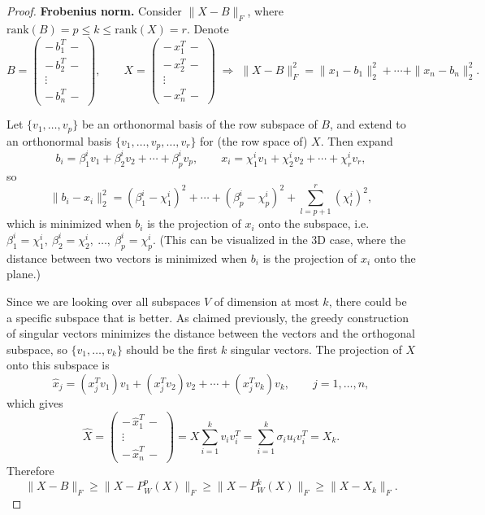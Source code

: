 \documentclass[
  letterpaper,
  DIV=11,
  numbers=noendperiod]{scrreprt}
\theoremstyle{definition}
\theoremstyle{plain}
\theoremstyle{plain}
\theoremstyle{definition}
\theoremstyle{plain}
\theoremstyle{plain}
\theoremstyle{remark}
\begin{document}
\begin{proof}
\textbf{Frobenius norm.} Consider \(\|X - B\|_F\), where
\(\mathrm{rank}(B) = p \le k \le \mathrm{rank}(X) = r\). Denote \[
B = \begin{pmatrix} -\,b_1^T\,- \\ -\,b_2^T\,- \\ \vdots \\ -\,b_n^T\,- \end{pmatrix}, \qquad
X = \begin{pmatrix} -\,x_1^T\,- \\ -\,x_2^T\,- \\ \vdots \\ -\,x_n^T\,- \end{pmatrix}
\;\Rightarrow\;
\|X - B\|_F^2 = \|x_1 - b_1\|_2^2 + \cdots + \|x_n - b_n\|_2^2 .
\]

Let \(\{v_1, \dots, v_p\}\) be an orthonormal basis of the row subspace
of \(B\), and extend to an orthonormal basis
\(\{v_1, \dots, v_p, \dots, v_r\}\) for (the row space of) \(X\). Then
expand \[
b_i = \beta_1^i v_1 + \beta_2^i v_2 + \cdots + \beta_p^i v_p, \qquad
x_i = \chi_1^i v_1 + \chi_2^i v_2 + \cdots + \chi_r^i v_r ,
\] so \[
\|b_i - x_i\|_2^2 = (\beta_1^i - \chi_1^i)^2 + \cdots + (\beta_p^i - \chi_p^i)^2 + \sum_{l=p+1}^{r} (\chi_l^i)^2 ,
\] which is minimized when \(b_i\) is the projection of \(x_i\) onto the
subspace,
i.e.~\(\beta_1^i = \chi_1^i,\ \beta_2^i = \chi_2^i,\ \dots,\ \beta_p^i = \chi_p^i\).
(This can be visualized in the 3D case, where the distance between two
vectors is minimized when \(b_i\) is the projection of \(x_i\) onto the
plane.)

Since we are looking over all subspaces \(V\) of dimension at most
\(k\), there could be a specific subspace that is better. As claimed
previously, the greedy construction of singular vectors minimizes the
distance between the vectors and the orthogonal subspace, so
\(\{v_1, \dots, v_k\}\) should be the first \(k\) singular vectors. The
projection of \(X\) onto this subspace is \[
\hat{x}_j = (x_j^T v_1)v_1 + (x_j^T v_2)v_2 + \cdots + (x_j^T v_k)v_k , \qquad j = 1, \dots, n,
\] which gives \[
\hat{X} = \begin{pmatrix} -\,\hat{x}_1^T\,- \\ \vdots \\ -\,\hat{x}_n^T\,- \end{pmatrix}
= X \sum_{i=1}^{k} v_i v_i^T
= \sum_{i=1}^{k} \sigma_i u_i v_i^T = X_k .
\] Therefore \[
\|X - B\|_F \ge \|X - P_W^{p}(X)\|_F \ge \|X - P_W^{k}(X)\|_F \ge \|X - X_k\|_F .
\]
\end{proof}
\end{document}
